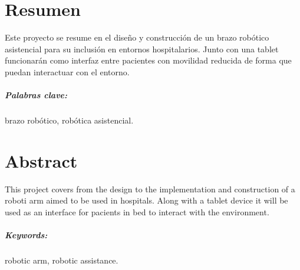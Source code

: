 \chapter{Resumen}

Este proyecto se resume en el diseño y construcción de un brazo robótico asistencial para su inclusión en entornos hospitalarios. Junto con una tablet funcionarán como interfaz entre pacientes con movilidad reducida de forma que puedan interactuar con el entorno.

\paragraph{Palabras clave:} brazo robótico, robótica asistencial.

\chapter{Abstract}

This project covers from the design to the implementation and construction of a roboti arm aimed to be used in hospitals. Along with a tablet device it will be used as an interface for pacients in bed to interact with the environment.

\paragraph{Keywords:} robotic arm, robotic assistance.